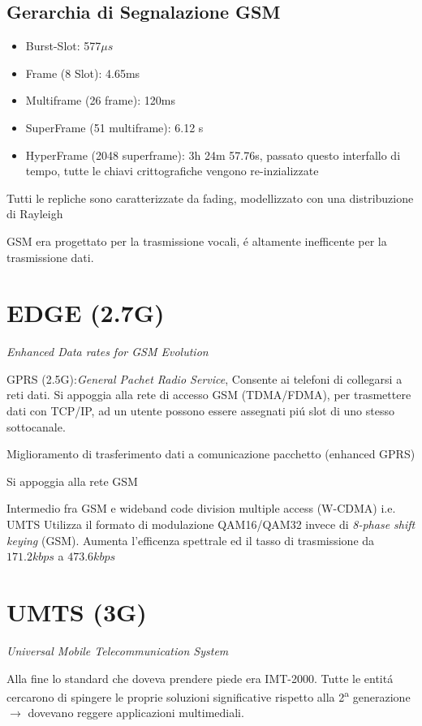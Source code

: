\documentclass{article}
\begin{document}
\subsection{Gerarchia di Segnalazione GSM}
\begin{itemize}
    \item Burst-Slot: 577$\mu s$
    \item Frame (8 Slot): 4.65ms
    \item Multiframe (26 frame): 120ms
    \item SuperFrame (51 multiframe): 6.12 s
    \item HyperFrame (2048 superframe): 3h 24m 57.76s, passato questo interfallo di tempo, tutte le chiavi crittografiche vengono re-inzializzate
\end{itemize}


Tutti le repliche sono caratterizzate da fading, modellizzato con una distribuzione di Rayleigh


GSM era progettato per la trasmissione vocali, \'e altamente inefficente per la trasmissione dati.



\section{EDGE (2.7G)}
\textit{Enhanced Data rates for GSM Evolution}

GPRS (2.5G):\@\textit{General Pachet Radio Service}, Consente ai telefoni di collegarsi a reti dati. Si appoggia alla rete di accesso GSM (TDMA/FDMA), per trasmettere dati con TCP/IP, ad un utente possono essere assegnati pi\'u slot di uno stesso sottocanale.

Miglioramento di trasferimento dati a comunicazione pacchetto (enhanced GPRS)

Si appoggia alla rete GSM

Intermedio fra GSM e wideband code division multiple access (W-CDMA) i.e. UMTS
Utilizza il formato di modulazione QAM16/QAM32 invece di \textit{8-phase shift keying} (GSM). Aumenta l'efficenza spettrale ed il tasso di trasmissione da $171.2kbps$ a $473.6kbps$

\newpage


\newpage
\section{UMTS (3G)}
\textit{Universal Mobile Telecommunication System}

Alla fine lo standard che doveva prendere piede era IMT-2000. Tutte le entit\'a cercarono di spingere le proprie soluzioni significative rispetto alla 2\textsuperscript{a} generazione $\rightarrow$ dovevano reggere applicazioni multimediali.
\end{document}
